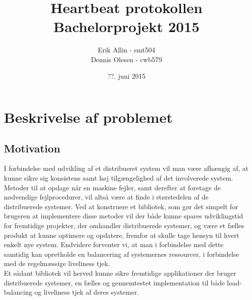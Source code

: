 \documentclass[a4paper,12pt]{article}
\title{Heartbeat protokollen
\\
Bachelorprojekt 2015}
\author{Erik Allin - smt504 \\ Dennis Olesen - cwb579}
\date{??. juni 2015}
\begin{document}
\maketitle
\newpage


\section*{Beskrivelse af problemet}
\subsection*{Motivation}
I forbindelse med udvikling af et distribueret system vil man være afhængig af, at kunne sikre sig konsistens samt høj tilgængelighed af det involverede system. Metoder til at opdage når en maskine fejler, samt derefter at foretage de nødvendige fejlprocedurer, vil altså være at finde i størstedelen af de distribuerede systemer.
Ved at konstruere et bibliotek, som gør det simpelt for brugeren at implementere disse metoder vil der både kunne spares udviklingstid for fremtidige projekter, der omhandler distribuerede systemer, og være et fælles produkt at kunne optimere og opdatere, fremfor at skulle tage hensyn til hvert enkelt nye system. Endvidere forventer vi, at man i forbindelse med dette samtidig kan opretholde en balancering af systemernes ressourcer, i forbindelse med de regelmæssige liveliness tjek. 
\\
Et sådant bibliotek vil herved kunne sikre fremtidige applikationer der bruger distribuerede systemer, en fælles og gennemtestet implementation til både load-balancing og liveliness tjek af deres systemer.
\end{document}
